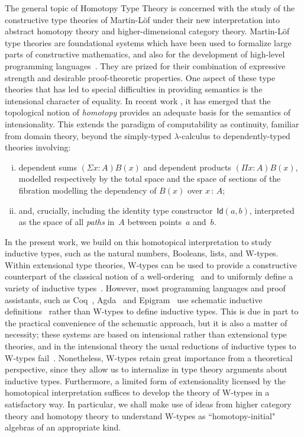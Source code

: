\documentclass[10pt,a4paper,oneside,reqno]{amsart}
\numberwithin{equation}{section}
\theoremstyle{mythm}
\theoremstyle{mydef}
\theoremstyle{myrmk}
\newcommand{\co}{\,{:}\,}
\newcommand{\Id}{\mathsf{Id}}
\begin{document}
The general topic of Homotopy Type Theory is concerned with the study of the constructive type theories of Martin-L\"of under their new interpretation into abstract homotopy theory and higher-dimensional category theory. Martin-L\"of type theories are foundational systems which have been used to formalize large parts of constructive mathematics, and also for the development of high-level programming languages~\cite{MartinLofP:conmcp}.  They are prized for their combination of expressive strength and desirable proof-theoretic properties.  One aspect of these type theories that has led to special difficulties in providing semantics is the intensional character of equality.  In recent work \cite{AwodeyS:homtmi,VoevodskyV:notts,vandenBergB:topsmi,AwodeyS:typth}, it has emerged that the topological notion of \emph{homotopy} provides an adequate basis for the semantics of intensionality.  This extends the paradigm of computability as continuity, familiar from domain theory, beyond the simply-typed 
$\lambda$-calculus to dependently-typed theories involving:\begin{enumerate}[(i)]
\item dependent sums $(\Sigma x\colon\!{A})B(x)$ and dependent products $(\Pi x\colon\!{A})B(x)$, modelled respectively by the total space and the space of sections of the fibration modelling the dependency of $B(x)$ over $ x \co A$; \item
and, crucially, including the identity type constructor~$\Id(a,b)$, interpreted as the space of all \emph{paths} in~$A$ between points~$a$ and~$b$. \end{enumerate}

In the present work, we build on this homotopical interpretation to study inductive types, such as the natural numbers, Booleans, lists, and W-types. Within extensional type theories, W-types can be used to  provide a constructive counterpart of the classical notion of a well-ordering~\cite{MartinLofP:inttt} and to uniformly define a variety of inductive types~\cite{DybjerP:repids}.
However, most programming languages and proof assistants, such as Coq~\cite{BertotY:inttpp}, Agda~\cite{NorellU:towppl} and Epigram~\cite{McBrideC:viefl} use schematic inductive definitions~\cite{CoquandT:inddt,PaulinMorhringC:inddsc} rather than W-types to define inductive types.  This is due in part to the practical convenience of the schematic approach, but it is also a matter of necessity; these systems are based on intensional rather than extensional type theories, and in the intensional theory the usual reductions of inductive types to W-types fail~\cite{DybjerP:repids,McBrideC:wtygnb}.
Nonetheless, W-types retain great importance from a theoretical perspective, since they allow us to internalize in type theory arguments about inductive types. Furthermore, a limited form of extensionality licensed by the homotopical interpretation suffices to develop the theory of W-types in a satisfactory way. In particular, we shall make use of ideas from higher category theory and homotopy theory to understand W-types as ``homotopy-initial" algebras of an appropriate kind.
\end{document}
